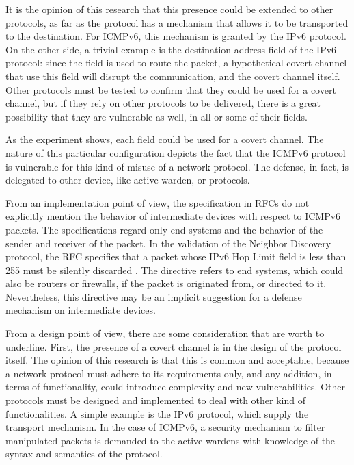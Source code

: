 \documentclass[12pt]{article}
\begin{document}
It is the opinion of this research that this presence could be extended to other protocols, as far as the protocol has a mechanism that allows it to be transported to the destination. For ICMPv6, this mechanism is granted by the IPv6 protocol. On the other side, a trivial example is the destination address field of the IPv6 protocol: since the field is used to route the packet, a hypothetical covert channel that use this field will disrupt the communication, and the covert channel itself. Other protocols must be tested to confirm that they could be used for a covert channel, but if they rely on other protocols to be delivered, there is a great possibility that they are vulnerable as well, in all or some of their fields.

As the experiment shows, each field could be used for a covert channel. The nature of this particular configuration depicts the fact that the ICMPv6 protocol is vulnerable for this kind of misuse of a network protocol. The defense, in fact, is delegated to other device, like active warden, or protocols.

From an implementation point of view, the specification in RFCs do not explicitly mention the behavior of intermediate devices with respect to ICMPv6 packets. The specifications regard only end systems and the behavior of the sender and receiver of the packet. In the validation of the Neighbor Discovery protocol, the RFC specifies that a packet whose IPv6 Hop Limit field is less than 255 must be silently discarded \cite{rfc4861}. The directive refers to end systems, which could also be routers or firewalls, if the packet is originated from, or directed to it. Nevertheless, this directive may be an implicit suggestion for a defense mechanism on intermediate devices. 

From a design point of view, there are some consideration that are worth to underline. First, the presence of a covert channel is in the design of the protocol itself. The opinion of this research is that this is common and acceptable, because a network protocol must adhere to its requirements only, and any addition, in terms of functionality, could introduce complexity and new vulnerabilities. Other protocols must be designed and implemented to deal with other kind of functionalities. A simple example is the IPv6 protocol, which supply the transport mechanism. In the case of ICMPv6, a security mechanism to filter manipulated packets is demanded to the active wardens with knowledge of the syntax and semantics of the protocol.
\end{document}
